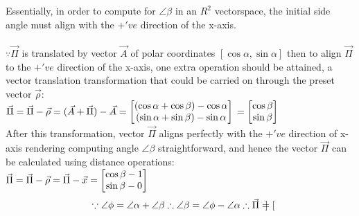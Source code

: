 {Essentially, in order to compute for $\angle{\beta}$ in an $R^2$ vectorspace, the initial side angle 
must align with the \(+'ve\) direction of the x-axis. 
\\\\
\(\because \vec{\Pi}\) is translated by vector \(\vec{A}\)
of polar coordinates \([\cos{\alpha}, \sin{\alpha}]\) then to
align \(\vec{\Pi}\) to the \(+'ve\) direction of the x-axis, one extra
operation should be attained, a vector translation transformation that 
could be carried on through the preset vector \( \vec{\rho} \):
\\
\(
\vec{\Pi} = \vec{\Pi} - \vec{\rho} \\
          = (\vec{A} + \vec{\Pi}) - \vec{A} \\
          = \begin{bmatrix}
            (\cos{\alpha} + \cos{\beta}) - \cos{\alpha}\\
            (\sin{\alpha} + \sin{\beta}) - \sin{\alpha}
            \end{bmatrix} \\
          = \begin{bmatrix}
            \cos{\beta} \\
            \sin{\beta}
            \end{bmatrix} \\
\)
\\ 
After this transformation, vector \(\vec{\Pi}\) aligns perfectly with the 
\(+'ve\) direction of x-axis rendering computing angle \(\angle{\beta}\) straightforward,
and hence the vector \(\vec{\Pi}\) can be calculated using distance operations: 
\\ 
\(
\vec{\Pi} = \vec{\Pi} - \vec{\rho} \\
          = \vec{\Pi} - \vec{x} \\
          = \begin{bmatrix}
            \cos{\beta} - 1\\
            \sin{\beta} - 0
            \end{bmatrix} \\
\)
\\
\begin{equation}
\because 
\angle{\phi} = \angle{\alpha} + \angle{\beta} \\
\\
\therefore \angle{\beta} = \angle{\phi} - \angle{\alpha} \\
\\
\therefore \vec{\Pi} = \begin{bmatrix}

\end{bmatrix}
\end{equation}}
